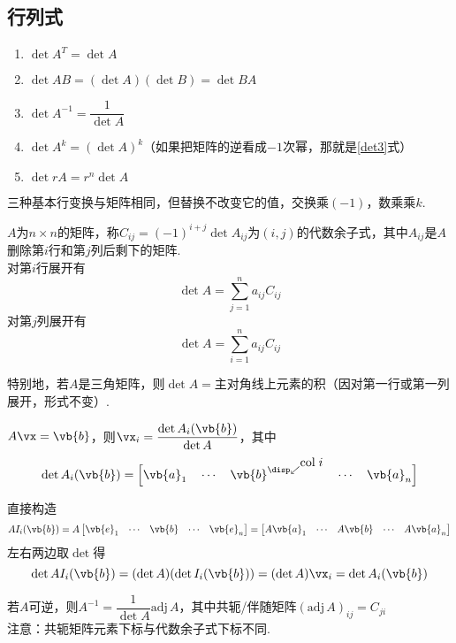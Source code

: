 \subsection{行列式}
\begin{proposition}[行列式的基本运算]\mbox{}\par
\begin{enumerate}
	\item $\det A^T=\det A$
	\item $\det AB=(\det A)(\det B)=\det BA$
	\item \label{det3}$\det A^{-1}=\dfrac{1}{\det A}$
	\item $\det A^k=(\det A)^k$（如果把矩阵的逆看成$-1$次幂，那就是\ref{det3}式）
	\item $\det rA=r^n\det A$
\end{enumerate}
\end{proposition}
\begin{proposition}[行列式基本行变换]
三种基本行变换与矩阵相同，但替换不改变它的值，交换乘$(-1)$，数乘乘$k$.
\end{proposition}
\begin{theorem}
$A$为$n\times n$的矩阵，称$C_{ij}=(-1)^{i+j}\det A_{ij}$为$(i,j)$的代数余子式，其中$A_{ij}$是$A$删除第$i$行和第$j$列后剩下的矩阵.\\
对第$i$行展开有
\[\det A=\sum_{j=1}^{n}a_{ij}C_{ij}\]
对第$j$列展开有
\[\det A=\sum_{i=1}^{n}a_{ij}C_{ij}\]
\end{theorem}
特别地，若$A$是三角矩阵，则$\det A=$主对角线上元素的积（因对第一行或第一列展开，形式不变）.
\begin{theorem}
$A\vx=\vb{b}$，则$\vx_i=\dfrac{\det A_i(\vb{b})}{\det A}$，其中\[\det A_i(\vb{b})=\Big[\vb{a}_1\quad\cdots\quad\vb{b}^{\disp\swarrow\raisebox{0.5em}{$\mathrm{col}\;i$}}\quad\cdots\quad\vb{a}_n\Big]\]
\end{theorem}
\begin{analysis}直接构造
\[AI_i(\vb{b})=A\begin{bmatrix}\vb{e}_1&\cdots&\vb{b}&\cdots&\vb{e}_n\end{bmatrix}=\begin{bmatrix}A\vb{a}_1&\cdots& A\vb{b}&\cdots& A\vb{a}_n\end{bmatrix}\]
左右两边取$\det$得
\[\det AI_i(\vb{b})=(\det A)(\det I_i(\vb{b}))=(\det A)\vx_i=\det A_i(\vb{b})\]
\end{analysis}
\begin{theorem}
若$A$可逆，则$A^{-1}=\dfrac{1}{\det A}\mathrm{adj}\,A$，其中共轭/伴随矩阵$(\mathrm{adj}\,A)_{ij}=C_{ji}$\\
注意：共轭矩阵元素下标与代数余子式下标不同.
\end{theorem}
